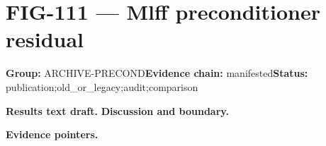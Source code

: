 \clearpage
\section{FIG-111 --- Mlff preconditioner residual}
\label{figpage:fig-111}
\textbf{Group:} ARCHIVE-PRECOND\quad \textbf{Evidence chain:} manifested\quad \textbf{Status:} publication;old\_or\_legacy;audit;comparison

\textbf{Results text draft.} 
\textbf{Discussion and boundary.} 


\textbf{Evidence pointers.}



\vfill
